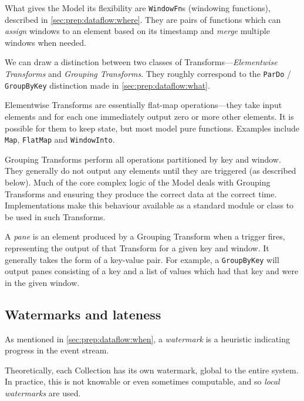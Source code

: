 What gives the Model its flexibility are \verb|WindowFn|s (windowing functions), described in \cref{sec:prep:dataflow:where}.
They are pairs of functions which can \emph{assign} windows to an element based on its timestamp and \emph{merge} multiple windows when needed.

We can draw a distinction between two classes of Transforms---\emph{Elementwise Transforms} and \emph{Grouping Transforms}.
They roughly correspond to the \verb|ParDo| / \verb|GroupByKey| distinction made in \cref{sec:prep:dataflow:what}.

Elementwise Transforms are essentially flat-map operations---they take input elements and for each one immediately output zero or more other elements.
It is possible for them to keep state, but most model pure functions.
Examples include \verb|Map|, \verb|FlatMap| and \verb|WindowInto|.

Grouping Transforms perform all operations partitioned by key and window.
They generally do not output any elements until they are triggered (as described below).
Much of the core complex logic of the Model deals with Grouping Transforms and ensuring they produce the correct data at the correct time.
Implementations make this behaviour available as a standard module or class to be used in such Transforms.

A \emph{pane} is an element produced by a Grouping Transform when a trigger fires, representing the output of that Transform for a given key and window.
It generally takes the form of a key-value pair.
For example, a \verb|GroupByKey| will output panes consisting of a key and a list of values which had that key and were in the given window.

\subsection{Watermarks and lateness}\label{sec:impl:dataflow:watermarks}\label{sec:impl:dataflow:lateness}

As mentioned in \cref{sec:prep:dataflow:when}, a \emph{watermark} is a heuristic indicating progress in the event stream.

Theoretically, each Collection has its own watermark, global to the entire system.
In practice, this is not knowable or even sometimes computable, and so \emph{local watermarks} are used.

